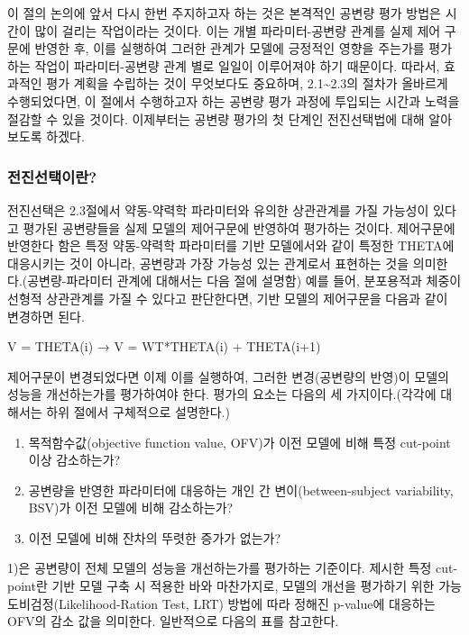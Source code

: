 \documentclass[
  10pt,
]{krantz}
\begin{document}
이 절의 논의에 앞서 다시 한번 주지하고자 하는 것은 본격적인 공변량 평가 방법은 시간이 많이 걸리는 작업이라는 것이다. 이는
개별 파라미터-공변량 관계를 실제 제어 구문에 반영한 후, 이를 실행하여 그러한 관계가 모델에 긍정적인 영향을 주는가를
평가하는 작업이 파라미터-공변량 관계 별로 일일이 이루어져야 하기 때문이다. 따라서, 효과적인 평가 계획을 수립하는 것이
무엇보다도 중요하며, 2.1\textasciitilde2.3의 절차가 올바르게 수행되었다면, 이 절에서 수행하고자 하는 공변량 평가 과정에 투입되는
시간과 노력을 절감할 수 있을 것이다. 이제부터는 공변량 평가의 첫 단계인 전진선택법에 대해 알아보도록 하겠다.

\hypertarget{uxc804uxc9c4uxc120uxd0dduxc774uxb780}{%
\subsubsection{전진선택이란?}\label{uxc804uxc9c4uxc120uxd0dduxc774uxb780}}

전진선택은 2.3절에서 약동-약력학 파라미터와 유의한 상관관계를 가질 가능성이 있다고 평가된 공변량들을 실제 모델의 제어구문에
반영하여 평가하는 것이다. 제어구문에 반영한다 함은 특정 약동-약력학 파라미터를 기반 모델에서와 같이 특정한 THETA에
대응시키는 것이 아니라, 공변량과 가장 가능성 있는 관계로서 표현하는 것을 의미한다.(공변량-파라미터 관계에 대해서는 다음
절에 설명함) 예를 들어, 분포용적과 체중이 선형적 상관관계를 가질 수 있다고 판단한다면, 기반 모델의 제어구문을 다음과
같이 변경하면 된다.

V = THETA(i) → V = WT*THETA(i) + THETA(i+1)

제어구문이 변경되었다면 이제 이를 실행하여, 그러한 변경(공변량의 반영)이 모델의 성능을 개선하는가를 평가하여야 한다. 평가의
요소는 다음의 세 가지이다.(각각에 대해서는 하위 절에서 구체적으로 설명한다.)

\begin{enumerate}
\def\labelenumi{\arabic{enumi})}
\item
  목적함수값(objective function value, OFV)가 이전 모델에 비해 특정 cut-point 이상
  감소하는가?
\item
  공변량을 반영한 파라미터에 대응하는 개인 간 변이(between-subject variability, BSV)가 이전
  모델에 비해 감소하는가?
\item
  이전 모델에 비해 잔차의 뚜렷한 증가가 없는가?
\end{enumerate}

1)은 공변량이 전체 모델의 성능을 개선하는가를 평가하는 기준이다. 제시한 특정 cut-point란 기반 모델 구축 시 적용한
바와 마찬가지로, 모델의 개선을 평가하기 위한 가능도비검정(Likelihood-Ration Test, LRT) 방법에 따라
정해진 p-value에 대응하는 OFV의 감소 값을 의미한다. 일반적으로 다음의 표를 참고한다.
\end{document}
